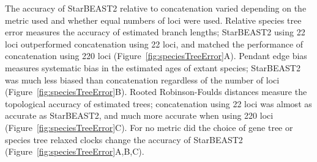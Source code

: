 \documentclass[12pt]{article}
\begin{document}
The accuracy of StarBEAST2 relative to concatenation varied depending on the
metric used and whether equal numbers of loci were used. Relative species tree
error measures the accuracy of estimated branch lengths; StarBEAST2 using 22
loci outperformed concatenation using 22 loci, and matched the performance of
concatenation using 220 loci (Figure~\ref{fig:speciesTreeError}A). Pendant
edge bias measures systematic bias in the estimated ages of extant species;
StarBEAST2 was much less biased than concatenation regardless of the number of loci
(Figure~\ref{fig:speciesTreeError}B). Rooted Robinson-Foulds distances measure
the topological accuracy of estimated trees; concatenation using 22 loci was
almost as accurate as StarBEAST2, and much more accurate when using 220 loci
(Figure~\ref{fig:speciesTreeError}C). For no metric did the choice of gene tree
or species tree relaxed clocks change the accuracy of StarBEAST2
(Figure~\ref{fig:speciesTreeError}A,B,C).
\end{document}
